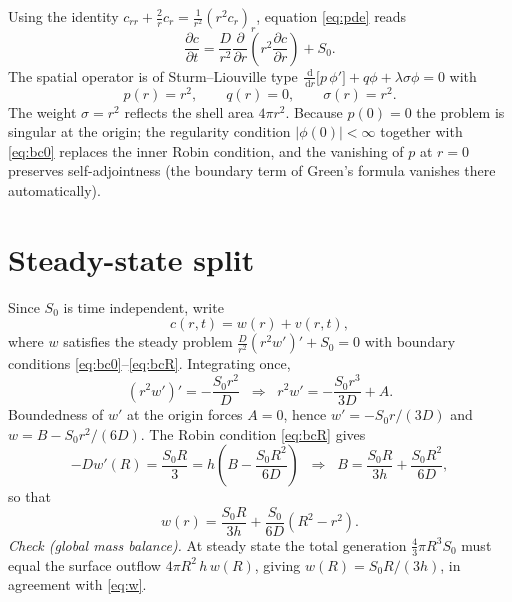 \documentclass[11pt,a4paper]{article}
\newcommand{\dd}{\,\mathrm{d}}
\begin{document}
Using the identity
$c_{rr} + \tfrac{2}{r}c_r = \tfrac{1}{r^2}\left(r^2 c_r\right)_r$,
equation \eqref{eq:pde} reads
\begin{equation}
\frac{\partial c}{\partial t}
= \frac{D}{r^2}\frac{\partial}{\partial r}\!\left(r^2 \frac{\partial c}{\partial r}\right) + S_0 .
\label{eq:pde2}
\end{equation}
The spatial operator is of Sturm--Liouville type
$\frac{\dd}{\dd r}\big[p\,\phi'\big] + q\phi + \lambda\sigma\phi = 0$ with
\begin{equation}
p(r) = r^2, \qquad q(r) = 0, \qquad \sigma(r) = r^2 .
\label{eq:pqsigma}
\end{equation}
The weight $\sigma = r^2$ reflects the shell area $4\pi r^2$. Because $p(0)=0$ the
problem is singular at the origin; the regularity condition
$|\phi(0)| < \infty$ together with \eqref{eq:bc0} replaces the inner Robin condition,
and the vanishing of $p$ at $r=0$ preserves self-adjointness (the boundary term of
Green's formula vanishes there automatically).

\section{Steady-state split}

Since $S_0$ is time independent, write
\begin{equation}
c(r,t) = w(r) + v(r,t),
\end{equation}
where $w$ satisfies the steady problem
$\frac{D}{r^2}\left(r^2 w'\right)' + S_0 = 0$ with boundary conditions
\eqref{eq:bc0}--\eqref{eq:bcR}. Integrating once,
\begin{equation}
\left(r^2 w'\right)' = -\frac{S_0 r^2}{D}
\;\;\Longrightarrow\;\;
r^2 w' = -\frac{S_0 r^3}{3D} + A .
\end{equation}
Boundedness of $w'$ at the origin forces $A = 0$, hence $w' = -S_0 r/(3D)$ and
$w = B - S_0 r^2/(6D)$. The Robin condition \eqref{eq:bcR} gives
\begin{equation}
-Dw'(R) = \frac{S_0 R}{3} = h\left(B - \frac{S_0 R^2}{6D}\right)
\;\;\Longrightarrow\;\;
B = \frac{S_0 R}{3h} + \frac{S_0 R^2}{6D},
\end{equation}
so that
\begin{equation}
\boxed{\;w(r) = \frac{S_0 R}{3h} + \frac{S_0}{6D}\left(R^2 - r^2\right).\;}
\label{eq:w}
\end{equation}
\emph{Check (global mass balance).} At steady state the total generation
$\tfrac{4}{3}\pi R^3 S_0$ must equal the surface outflow $4\pi R^2\, h\, w(R)$, giving
$w(R) = S_0R/(3h)$, in agreement with \eqref{eq:w}.
\end{document}

